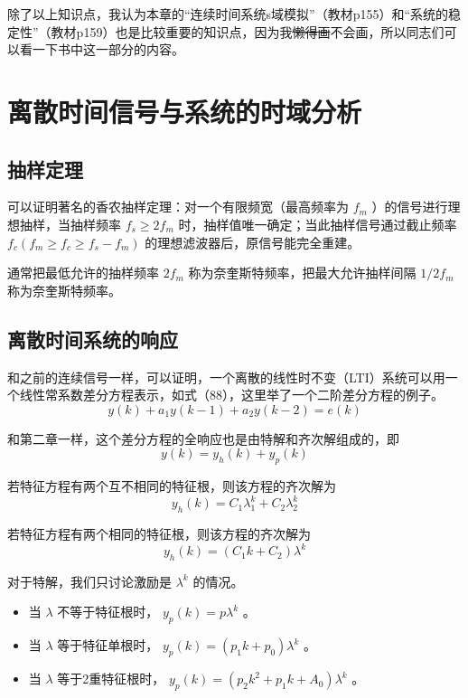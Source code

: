 \documentclass[UTF8,a4paper,11pt]{article}
\begin{document}
除了以上知识点，我认为本章的“连续时间系统s域模拟”（教材p155）和“系统的稳定性”（教材p159）也是比较重要的知识点，因为我\sout{懒得画}不会画，所以同志们可以看一下书中这一部分的内容。

\section{离散时间信号与系统的时域分析}
\subsection{抽样定理}
可以证明著名的香农抽样定理：对一个有限频宽（最高频率为 $f_m$ ）的信号进行理想抽样，当抽样频率 $f_s\geq 2f_m$ 时，抽样值唯一确定；当此抽样信号通过截止频率 $f_c (f_m\geq f_c\geq f_s-f_m)$ 的理想滤波器后，原信号能完全重建。

通常把最低允许的抽样频率 $2f_m$ 称为奈奎斯特频率，把最大允许抽样间隔 $1/2f_m$ 称为奈奎斯特频率。

\subsection{离散时间系统的响应}
和之前的连续信号一样，可以证明，一个离散的线性时不变（LTI）系统可以用一个线性常系数差分方程表示，如式（88），这里举了一个二阶差分方程的例子。
\begin{equation}
y(k)+a_1y(k-1)+a_2y(k-2)=e(k)
\end{equation}

和第二章一样，这个差分方程的全响应也是由特解和齐次解组成的，即
\begin{equation}
y(k)=y_h(k)+y_p(k)
\end{equation}

若特征方程有两个互不相同的特征根，则该方程的齐次解为
\begin{equation}
y_h(k)=C_1\lambda_1^k+C_2\lambda_2^k
\end{equation}

若特征方程有两个相同的特征根，则该方程的齐次解为
\begin{equation}
y_h(k)=(C_1k+C_2)\lambda^k
\end{equation}

对于特解，我们只讨论激励是 $\lambda^k$ 的情况。
\begin{itemize}
\item 当 $\lambda$ 不等于特征根时， $y_p(k)=p\lambda^k$ 。
\item 当 $\lambda$ 等于特征单根时， $y_p(k)=(p_1k+p_0)\lambda^k$ 。
\item 当 $\lambda$ 等于2重特征根时， $y_p(k)=(p_2k^2+p_1k+A_0)\lambda^k$ 。
\end{itemize} 
\end{document}
